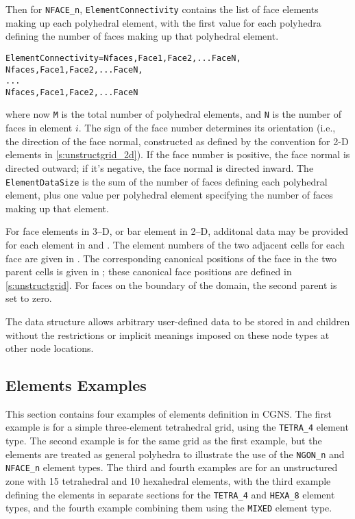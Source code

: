 Then for \texttt{NFACE\_n}, \texttt{ElementConnectivity} contains the
list of face elements making up each polyhedral element, with the first
value for each polyhedra defining the number of faces making up that
polyhedral element.
\begin{alltt}
  ElementConnectivity = Nfaces, Face1, Face2, ... FaceN,
                        Nfaces, Face1, Face2, ... FaceN,
                        ...
                        Nfaces, Face1, Face2, ... FaceN
\end{alltt}
where now \texttt{M} is the total number of polyhedral elements, and
\texttt{N} is the number of faces in element $i$.
The sign of the face number determines its orientation (i.e., the
direction of the face normal, constructed as defined by the
convention for 2-D elements in \autoref{s:unstructgrid_2d}).
If the face number is positive, the face normal is directed outward; if
it's negative, the face normal is directed inward.
The \texttt{ElementDataSize} is the 
sum of the number of faces defining each
polyhedral element, plus one value per polyhedral element
specifying the number of faces making up that element.

For face elements in 3--D, or bar element in 2--D, additonal data may be provided
for each element in  and . The
element numbers of the two adjacent cells for each face are given in
.  The corresponding canonical positions of the face in the
two parent cells is given in ; these canonical
face positions are defined in \autoref{s:unstructgrid}.  For faces on the
boundary of the domain, the second parent is set to zero.

The  data structure allows arbitrary
user-defined data to be stored in  and
 children without the restrictions or implicit
meanings imposed on these node types at other node locations.

\subsection{Elements Examples}
\label{s:element_example}

This section contains four examples of elements definition in CGNS.
The first example is for a simple three-element tetrahedral grid, using
the \texttt{TETRA\_4} element type.
The second example is for the same grid as the first example, but the
elements are treated as general polyhedra to illustrate the use of the
\texttt{NGON\_n} and \texttt{NFACE\_n} element types.
The third and fourth examples are for an unstructured zone with
15 tetrahedral and 10 hexahedral elements, with the third example
defining the elements in separate sections for the \texttt{TETRA\_4} and
\texttt{HEXA\_8} element types, and the fourth example combining them
using the \texttt{MIXED} element type.

